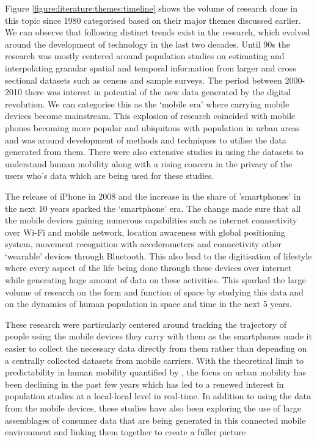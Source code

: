 Figure \ref{figure:literature:themes:timeline} shows the volume of research done in this topic since 1980 categorised based on their major themes discussed earlier.
We can observe that following distinct trends exist in the research, which evolved around the development of technology in the last two decades.
Until 90s the research was mostly centered around population studies on estimating and interpolating granular spatial and temporal information from larger and cross sectional datasets such as census and sample surveys.
The period between 2000-2010 there was interest in potential of the new data generated by the digital revolution. 
We can categorise this as the `mobile era' where carrying mobile devices become mainstream.
This explosion of research coincided with mobile phones becoming more popular and ubiquitous with population in urban areas and was around development of methods and techniques to utilise the data generated from them.
There were also extensive studies in using the datasets to understand human mobility along with a rising concern in the privacy of the users who's data which are being used for these studies.

The release of iPhone in 2008 and the increase in the share of 'smartphones' in the next 10 years sparked the `smartphone' era. 
The change made sure that all the mobile devices gaining numerous capabilities such as internet connectivity over Wi-Fi and mobile network, location awareness with global positioning system, movement recognition with accelerometers and connectivity other `wearable' devices through Bluetooth.
This also lead to the digitisation of lifestyle where every aspect of the life being done through these devices over internet while generating huge amount of data on these activities.
This sparked the large volume of research on the form and function of space by studying this data and on the dynamics of human population in space and time in the next 5 years.


These research were particularly centered around tracking the trajectory of people using the mobile devices they carry with them as the smartphones made it easier to collect the necessary data directly from them rather than depending on a centrally collected datasets from mobile carriers. 
With the theoretical limit to predictability in human mobility quantified by \citet{song2010}, the focus on urban mobility has been declining in the past few years which has led to a renewed interest in population studies at a local-local level in real-time.
In addition to using the data from the mobile devices, these studies have also been exploring the use of large assemblages of consumer data that are being generated in this connected mobile environment and linking them together to create a fuller picture \cite{cdrc2018}

